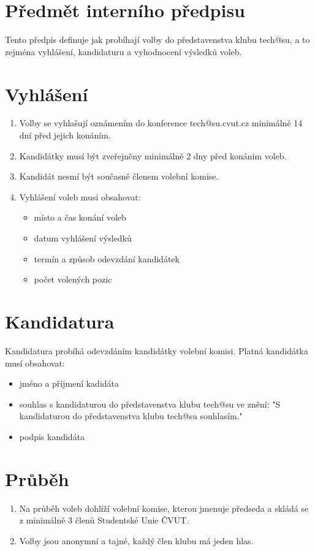 \documentclass[10pt]{article}
\begin{document}
\section{Předmět interního předpisu}
	Tento předpis definuje jak probíhají volby do představenstva klubu tech@su, a to zejména vyhlášení, kandidaturu a vyhodnocení výsledků voleb.

\section{Vyhlášení}
	\begin{enumerate}
		\item Volby se vyhlašují oznámením do konference tech@su.cvut.cz minimálně 14 dní před jejich konáním.
		\item Kandidátky musí být zveřejněny minimálně 2 dny před konáním voleb.
		\item Kandidát nesmí být současně členem volební komise.
		\item Vyhlášení voleb musí obsahovat:
			\begin{itemize}
				\item místo a čas konání voleb
				\item datum vyhlášení výsledků
				\item termín a způsob odevzdání kandidátek
				\item počet volených pozic
			\end{itemize}
	\end{enumerate}
	
\section{Kandidatura}
	Kandidatura probíhá odevzdáním kandidátky volební komisi. Platná kandidátka musí obsahovat:
	\begin{itemize}
		\item jméno a příjmení kadidáta
		\item souhlas s kandidaturou do představenstva klubu tech@su ve znění: "S kandidaturou do představenstva klubu tech@su souhlasím."
		\item podpis kandidáta
	\end{itemize}

\section{Průběh}
	\begin{enumerate}
		\item Na průběh voleb dohlíží volební komise, kterou jmenuje předseda a skládá se z minimálně 3 členů Studentské Unie ČVUT.
		\item Volby jsou anonymní a tajné, každý člen klubu má jeden hlas.
	\end{enumerate}
\end{document}
